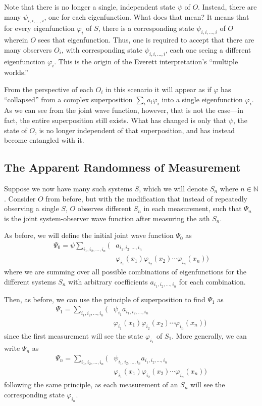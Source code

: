 \documentclass[
    12pt,
    letterpaper,
    aps,
    prd,
    longbibliography,
    twocolumn,
    nofootinbib,
    raggedbottom,
    amsmath,
    amssymb,
    amsfonts,
]{revtex4-1}
\newcommand{\bbm}[1]{\mathbb{#1}}
\renewcommand{\phi}{\varphi}
\begin{document}
Note that there is no longer a single, independent state $\psi$ of $O$. Instead, there are many $\psi_{i,i,\ldots,i}$, one for each eigenfunction. What does that mean? It means that for every eigenfunction $\phi_i$ of $S$, there is a corresponding state $\psi_{i,i,\ldots,i}$ of $O$ wherein $O$ sees that eigenfunction. Thus, one is required to accept that there are many observers $O_i$, with corresponding state $\psi_{i,i,\ldots,i}$, each one seeing a different eigenfunction $\phi_i$. This is the origin of the Everett interpretation's ``multiple worlds.''

From the perspective of each $O_i$ in this scenario it will appear as if $\phi$ has ``collapsed'' from a complex superposition $\sum_i a_i \phi_i$ into a single eigenfunction $\phi_i$. As we can see from the joint wave function, however, that is not the case---in fact, the entire superposition still exists. What has changed is only that $\psi$, the state of $O$, is no longer independent of that superposition, and has instead become entangled with it.

\subsection{The Apparent Randomness of Measurement}

Suppose we now have many such systems $S$, which we will denote $S_n$ where $n \in \bbm N$. Consider $O$ from before, but with the modification that instead of repeatedly observing a single $S$, $O$ observes different $S_n$ in each measurement, such that $\Psi_n$ is the joint system-observer wave function after measuring the $n$th $S_n$.

As before, we will define the initial joint wave function $\Psi_0$ as
\begin{align*}
    \Psi_0 = \psi \sum_{i_1, i_2, \ldots, i_n}\big( & a_{i_1, i_2, \ldots, i_n} \\
    & \phi_{i_1}(x_1) \phi_{i_2}(x_2) \cdots \phi_{i_n}(x_n) \big)
\end{align*}
where we are summing over all possible combinations of eigenfunctions for the different systems $S_n$ with arbitrary coefficients $a_{i_1, i_2, \ldots, i_n}$ for each combination.

Then, as before, we can use the principle of superposition to find $\Psi_1$ as
\begin{align*}
    \Psi_1 = \sum_{i_1, i_2, \ldots, i_n}\big( & \psi_{i_1} a_{i_1, i_2, \ldots, i_n} \\
    & \phi_{i_1}(x_1) \phi_{i_2}(x_2) \cdots \phi_{i_n}(x_n) \big)
\end{align*}
since the first measurement will see the state $\phi_{i_1}$ of $S_1$. More generally, we can write $\Psi_n$ as
\begin{align*}
    \Psi_n = \sum_{i_1, i_2, \ldots, i_n}\big( & \psi_{i_1, i_2, \ldots, i_n} a_{i_1, i_2, \ldots, i_n} \\
    & \phi_{i_1}(x_1) \phi_{i_2}(x_2) \cdots \phi_{i_n}(x_n) \big)
\end{align*}
following the same principle, as each measurement of an $S_n$ will see the corresponding state $\phi_{i_n}$.
\end{document}
